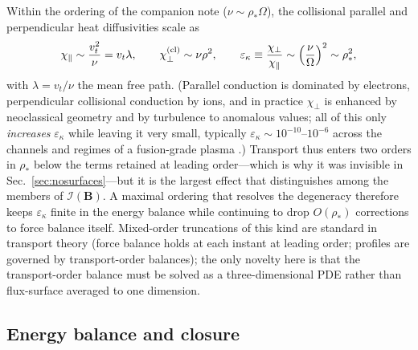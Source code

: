 \documentclass[english]{article}
\newcommand{\bB}{\mathbf{B}}
\begin{document}
Within the ordering of the companion note ($\nu\sim\rho_*\Omega$), the collisional parallel and
perpendicular heat diffusivities scale as
\begin{equation}
\chi_\parallel\sim\frac{v_t^{2}}{\nu}=v_t\lambda,
\qquad
\chi_\perp^{\rm (cl)}\sim\nu\rho^{2},
\qquad
\varepsilon_\kappa\equiv\frac{\chi_\perp}{\chi_\parallel}
\sim\Big(\frac{\nu}{\Omega}\Big)^{2}\sim\rho_*^{2},
\label{eq:epsilon_kappa}
\end{equation}
with $\lambda=v_t/\nu$ the mean free path. (Parallel conduction is dominated by electrons,
perpendicular collisional conduction by ions, and in practice $\chi_\perp$ is enhanced by
neoclassical geometry and by turbulence to anomalous values; all of this only \emph{increases}
$\varepsilon_\kappa$ while leaving it very small, typically
$\varepsilon_\kappa\sim10^{-10}$--$10^{-6}$ across the channels and regimes of a fusion-grade
plasma \cite{braginskii1965,helander_sigmar}.) Transport thus enters two orders in $\rho_*$ below
the terms retained at leading order---which is why it was invisible in
Sec.~\ref{sec:nosurfaces}---but it is the largest effect that distinguishes among the members of
$\mathcal{I}(\bB)$. A maximal ordering that resolves the degeneracy therefore keeps
$\varepsilon_\kappa$ finite in the energy balance while continuing to drop $O(\rho_*)$ corrections
to force balance itself. Mixed-order truncations of this kind are standard in transport theory
(force balance holds at each instant at leading order; profiles are governed by transport-order
balances); the only novelty here is that the transport-order balance must be solved as a
three-dimensional PDE rather than flux-surface averaged to one dimension.

\subsection{Energy balance and closure}
\label{sec:energy}
\end{document}

